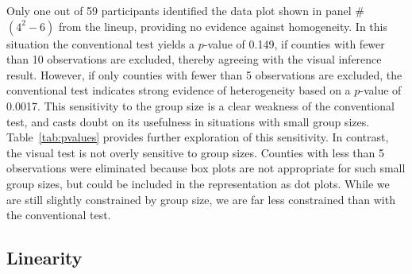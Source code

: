 \documentclass[12pt]{article}
\newcommand{\hh}[1]{{\color{orange} #1}}
\newcommand{\alnote}[1]{\todo[inline,color=green!40]{#1}} %
\begin{document}
Only one out of  59 participants identified the data plot shown in panel \#$(4^2 - 6)$ from the lineup, providing no evidence against homogeneity. In this situation the conventional test yields a $p$-value of 0.149, if counties with fewer than 10 observations are excluded, thereby agreeing with the visual inference result. However, if only counties with fewer than 5 observations are excluded, the conventional test indicates strong evidence of heterogeneity based on a $p$-value of 0.0017.
 This sensitivity to the group size is a clear weakness of the conventional test, and casts doubt on its usefulness in situations with small group sizes. Table~\ref{tab:pvalues} provides further exploration of this sensitivity. In contrast, the visual test is not overly sensitive to group sizes. Counties with less than 5 observations were eliminated because box plots are not appropriate for such small group sizes, but could be included in the representation as dot plots. While we are still slightly constrained by group size, we are far less constrained than with the conventional test.
 




\subsection{Linearity}
\end{document}

